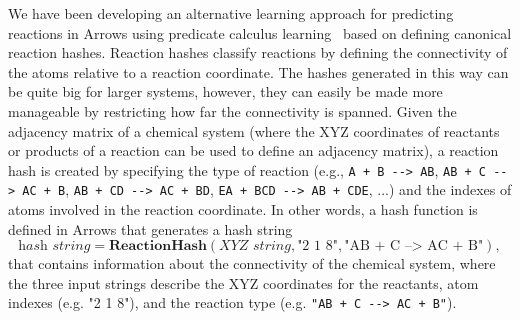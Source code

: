 \documentclass[runningheads,a4paper]{llncs}
\begin{document}
We have been developing an alternative learning approach for predicting reactions in Arrows using predicate calculus learning~\cite{Charniak1985} based on defining canonical reaction hashes.  Reaction hashes classify reactions by defining the connectivity of the atoms relative to a reaction coordinate. The hashes generated in this way can be quite big for larger systems, however, they can easily be made more manageable by restricting how far the connectivity is spanned.  Given the adjacency matrix of a chemical system (where the XYZ coordinates of reactants or products of a reaction can be used to define an adjacency matrix), a reaction hash is created by specifying the type of reaction (e.g., \verb|A + B --> AB|, \verb|AB + C --> AC + B|, \verb|AB + CD --> AC + BD|, \verb|EA + BCD --> AB + CDE|, ...) and the indexes of atoms involved in the reaction coordinate.  In other words, a hash function is defined in Arrows that generates a hash string
\small
\begin{equation*}
    \textit{hash string} = \textbf{ReactionHash}(\textit{XYZ string},\text{"2 1 8"}, \text{"AB + C --> AC + B"}) ,
\end{equation*}
\normalsize
that contains information about the connectivity of the chemical system, where the three input strings describe the XYZ coordinates for the reactants, atom indexes (e.g. "2 1 8"), and the reaction type (e.g. \verb|"AB + C --> AC + B"|).
\end{document}
